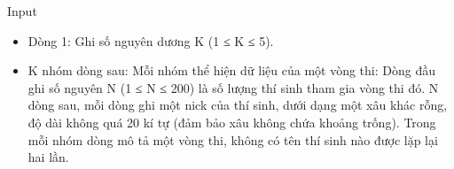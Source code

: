 Input
\begin{itemize}
	\item Dòng 1: Ghi số nguyên dương K (1 ≤ K ≤ 5).
	\item K nhóm dòng sau: Mỗi nhóm thể hiện dữ liệu của một vòng thi: Dòng đầu ghi số nguyên N (1 ≤ N ≤ 200) là số lượng thí sinh tham gia vòng thi đó. N dòng sau, mỗi dòng ghi một nick của thí sinh, dưới dạng một xâu khác rỗng, độ dài không quá 20 kí tự (đảm bảo xâu không chứa khoảng trống). Trong mỗi nhóm dòng mô tả một vòng thi, không có tên thí sinh nào được lặp lại hai lần.
\end{itemize}